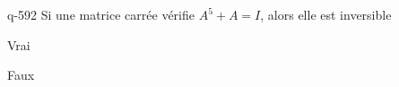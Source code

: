 \begin{truefalse}{q-592}
Si une matrice carrée vérifie $A^5+A=I$, alors elle est inversible
\item* Vrai
\item Faux
\end{truefalse}

